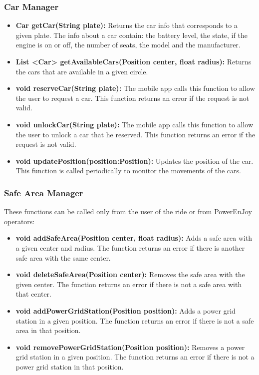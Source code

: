 \subsubsection{Car Manager}
\begin{itemize}
	\item \textbf{Car getCar(String plate):} Returns the car info that corresponds to a given plate.
	The info about a car contain: the battery level, the state, if the engine is on or off, the number of seats, the model and the manufacturer.
	\item \textbf{List \textless Car\textgreater{} getAvailableCars(Position center, float radius):} Returns the cars that are available in a given circle.
	\item \textbf{void reserveCar(String plate):} The mobile app calls this function to allow the user to request a car. This function returns an error if the request is not valid.
	\item \textbf{void unlockCar(String plate):} The mobile app calls this function to allow the user to unlock a car that he reserved. This function returns an error if the request is not valid.
	\item \textbf{void updatePosition(position:Position):} Updates the position of the car. This function is called periodically to monitor the movements of the cars.
\end{itemize}

\subsubsection{Safe Area Manager}
These functions can be called only from the user of the ride or from PowerEnJoy operators:
\begin{itemize}
	\item \textbf{void addSafeArea(Position center, float radius):} Adds a safe area with a given center and radius. The function returns an error if there is another safe area with the same center.
	\item \textbf{void deleteSafeArea(Position center):} Removes the safe area with the given center. The function returns an error if there is not a safe area with that center.
	\item \textbf{void addPowerGridStation(Position position):} Adds a power grid station in a given position. The function returns an error if there is not a safe area in that position.
	\item \textbf{void removePowerGridStation(Position position):} Removes a power grid station in a given position. The function returns an error if there is not a power grid station in that position.
\end{itemize}

